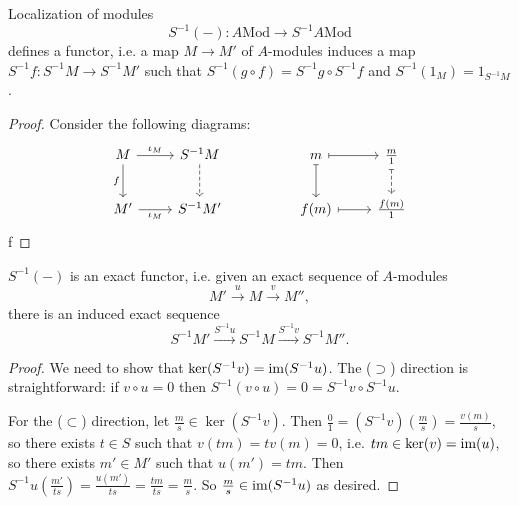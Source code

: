 \documentclass[12pt]{article}
\begin{document}
\begin{proposition}
	Localization of modules 
	\begin{equation*}
		S^{-1}(-): A\text{Mod} \to S^{-1}A\text{Mod}
	\end{equation*}
	defines a functor, i.e. a map $M\to M'$ of $A$-modules induces a map $S^{-1}f:S^{-1}M\to S^{-1}M'$ such that $S^{-1}(g\circ f) = S^{-1}g\circ S^{-1}f$ and $S^{-1}(1_M)=1_{S^{-1}M}$.
\end{proposition}
\begin{proof}
	Consider the following diagrams:
	\begin{equation*}
\begin{tikzcd}
M \arrow[d, "f"'] \arrow[r, "\iota_M"] & S^{-1}M \arrow[d, dashed] &  & m \arrow[r, maps to] \arrow[d, maps to] & \frac{m}{1} \arrow[d, dashed, maps to] \\
M' \arrow[r, "\iota_M"']               & S^{-1}M'                  &  & f(m) \arrow[r, maps to]                 & \frac{f(m)}{1}                        
\end{tikzcd}
	\end{equation*}
	f 
\end{proof}

\begin{proposition}
	$S^{-1}(-)$ is an exact functor, i.e. given an exact sequence of $A$-modules 
	\begin{equation*}
		M' \overset{u}{\longrightarrow} M \overset{v}{\longrightarrow} M'',
	\end{equation*}
	there is an induced exact sequence 
	\begin{equation*}
		S^{-1}M' \overset{S^{-1}u}{\longrightarrow} S^{-1}M \overset{S^{-1}v}{\longrightarrow} S^{-1}M''.
	\end{equation*}
\end{proposition}
\begin{proof}
	We need to show that $\ker(S^{-1}v) =\text{im}(S^{-1}u)$. The ($\supset$) direction is straightforward: if $v\circ u=0$ then $S^{-1}(v\circ u)=0=S^{-1}v \circ S^{-1}u$.

	For the ($\subset$) direction, let $\frac{m}{s}\in\ker(S^{-1}v)$. Then $\frac{0}{1}=(S^{-1}v)(\frac{m}{s})=\frac{v(m)}{s}$, so there exists $t\in S$ such that $v(tm)=tv(m)=0$, i.e. $tm\in\ker(v)=\text{im}(u)$, so there exists $m'\in M'$ such that $u(m')=tm$. Then $S^{-1}u(\frac{m'}{ts})=\frac{u(m')}{ts} = \frac{tm}{ts}=\frac{m}{s}$. So $\frac{m}{s}\in\text{im}(S^{-1}u)$ as desired.
\end{proof}
\end{document}
